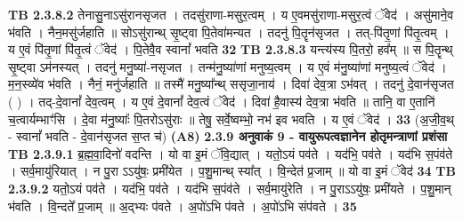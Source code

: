 \documentclass[17pt]{extarticle}
\begin{document}
                  \newline
                                \textbf{ TB 2.3.8.2} \newline
                  तेनासु॒नाऽसु॑रानसृजत । तदसु॑राणा-मसुर॒त्वम् । य ए॒वमसु॑राणा-मसुर॒त्वं ॅवेद॑ । असु॑माने॒व भ॑वति । नैन॒मसु॑र्जहाति ॥ सोऽसु॑रान्थ् सृ॒ष्ट्वा पि॒तेवा॑मन्यत । तदनु॑ पि॒तॄन॑सृजत । तत्-पि॑तृ॒णां पि॑तृ॒त्वम् । य ए॒वं पि॑तृ॒णां पि॑तृ॒त्वं ॅवेद॑ । पि॒तेवै॒व स्वानां᳚ भवति \textbf{ 32} \newline
                  \newline
                                \textbf{ TB 2.3.8.3} \newline
                  यन्त्य॑स्य पि॒तरो॒ हव᳚म् ॥ स पि॒तॄन्थ् सृ॒ष्ट्वा ऽम॑नस्यत् । तदनु॑ मनु॒ष्या॑-नसृजत । तन्म॑नु॒ष्या॑णां मनुष्य॒त्वम् । य ए॒वं म॑नु॒ष्या॑णां मनुष्य॒त्वं ॅवेद॑ । म॒न॒स्व्ये॑व भ॑वति । नैनं॒ मनु॑र्जहाति ॥ तस्मै॑ मनु॒ष्या᳚न्थ् ससृजा॒नाय॑ । दिवा॑ देव॒त्रा ऽभ॑वत् । तदनु॑ दे॒वान॑सृजत ( ) । तद्-दे॒वानां᳚ देव॒त्वम् । य ए॒वं दे॒वानां᳚ देव॒त्वं ॅवेद॑ । दिवा॑ है॒वास्य॑ देव॒त्रा भ॑वति ॥ तानि॒ वा ए॒तानि॑ च॒त्वार्यम्भाꣳ॑सि । दे॒वा म॑नु॒ष्याः᳚ पि॒तरोऽसु॑राः ॥ तेषु॒ सर्वे॒ष्वम्भो॒ नभ॑ इव भवति । य ए॒वं ॅवेद॑ । \textbf{ 33} \newline
                  \newline
                                    (अ॒जी॒व॒थ् - स्वानां᳚ भवति - दे॒वान॑सृजत स॒प्त च॑) \textbf{(A8)} \newline \newline
                \textbf{ 2.3.9      अनुवाकं   9 - वायुरूपत्वज्ञानेन होतृमन्त्राणां प्रशंसा} \newline
                                \textbf{ TB 2.3.9.1} \newline
                  [(य॒था॒स्था॒नं ग॑र्भि॒ण्यः॑) इस् ऒन्ल्य् इन्स्त्रुच्तिऒन् , नॊत् अ मन्त्र]ब्र॒ह्म॒वा॒दिनो॑ वदन्ति । यो वा इ॒मं ॅवि॒द्यात् । यतो॒ऽयं पव॑ते । यद॑भि॒ पव॑ते । यद॑भि स॒पंव॑ते । सर्व॒मायु॑रियात् । न पु॒रा ऽऽयु॑षः॒ प्रमी॑येत । प॒शु॒मान्थ् स्या᳚त् । वि॒न्देत॑ प्र॒जाम् ॥ यो वा इ॒मं ॅवेद॑ \textbf{ 34} \newline
                  \newline
                                \textbf{ TB 2.3.9.2} \newline
                  यतो॒ऽयं पव॑ते । यद॑भि॒ पव॑ते । यद॑भि स॒पंव॑ते । सर्व॒मायु॑रेति । न पु॒राऽऽयु॑षः॒ प्रमी॑यते । प॒शु॒मान् भ॑वति । वि॒न्दते᳚ प्र॒जाम् ॥ अ॒द्भ्यः प॑वते । अ॒पो॑ऽभि प॑वते । अ॒पो॑ऽभि संप॑वते । \textbf{ 35} \newline
                  \newline
\end{document}
